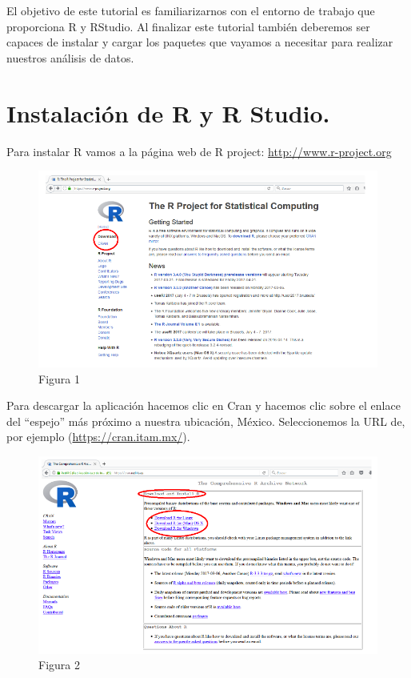 \documentclass[
]{book}
\begin{document}
El objetivo de este tutorial es familiarizarnos con el entorno de trabajo que proporciona R y RStudio. Al finalizar este tutorial también deberemos ser capaces de instalar y cargar los paquetes que vayamos a necesitar para realizar nuestros análisis de datos.

\hypertarget{instalaciuxf3n-de-r-y-r-studio.}{%
\section{Instalación de R y R Studio.}\label{instalaciuxf3n-de-r-y-r-studio.}}

Para instalar R vamos a la página web de R project: \url{http://www.r-project.org}

\begin{figure}
\centering
\includegraphics{imagenes/01.png}
\caption{Figura 1}
\end{figure}

Para descargar la aplicación hacemos clic en Cran y hacemos clic sobre el enlace del ``espejo'' más próximo a nuestra ubicación, México. Seleccionemos la URL de, por ejemplo (\url{https://cran.itam.mx/}).

\begin{figure}
\centering
\includegraphics{imagenes/02.png}
\caption{Figura 2}
\end{figure}
\end{document}
